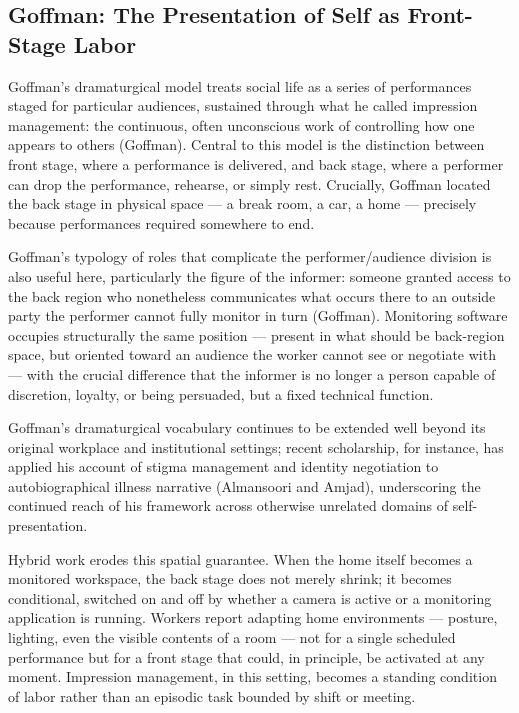 \documentclass[12pt]{article}
\begin{document}
\subsection{Goffman: The Presentation of Self as Front-Stage Labor}

Goffman's dramaturgical model treats social life as a series of performances staged for particular audiences, sustained through what he called impression management: the continuous, often unconscious work of controlling how one appears to others (Goffman). Central to this model is the distinction between front stage, where a performance is delivered, and back stage, where a performer can drop the performance, rehearse, or simply rest. Crucially, Goffman located the back stage in physical space --- a break room, a car, a home --- precisely because performances required somewhere to end.

Goffman's typology of roles that complicate the performer/audience division is also useful here, particularly the figure of the informer: someone granted access to the back region who nonetheless communicates what occurs there to an outside party the performer cannot fully monitor in turn (Goffman). Monitoring software occupies structurally the same position --- present in what should be back-region space, but oriented toward an audience the worker cannot see or negotiate with --- with the crucial difference that the informer is no longer a person capable of discretion, loyalty, or being persuaded, but a fixed technical function.

Goffman's dramaturgical vocabulary continues to be extended well beyond its original workplace and institutional settings; recent scholarship, for instance, has applied his account of stigma management and identity negotiation to autobiographical illness narrative (Almansoori and Amjad), underscoring the continued reach of his framework across otherwise unrelated domains of self-presentation.

Hybrid work erodes this spatial guarantee. When the home itself becomes a monitored workspace, the back stage does not merely shrink; it becomes conditional, switched on and off by whether a camera is active or a monitoring application is running. Workers report adapting home environments --- posture, lighting, even the visible contents of a room --- not for a single scheduled performance but for a front stage that could, in principle, be activated at any moment. Impression management, in this setting, becomes a standing condition of labor rather than an episodic task bounded by shift or meeting.
\end{document}
